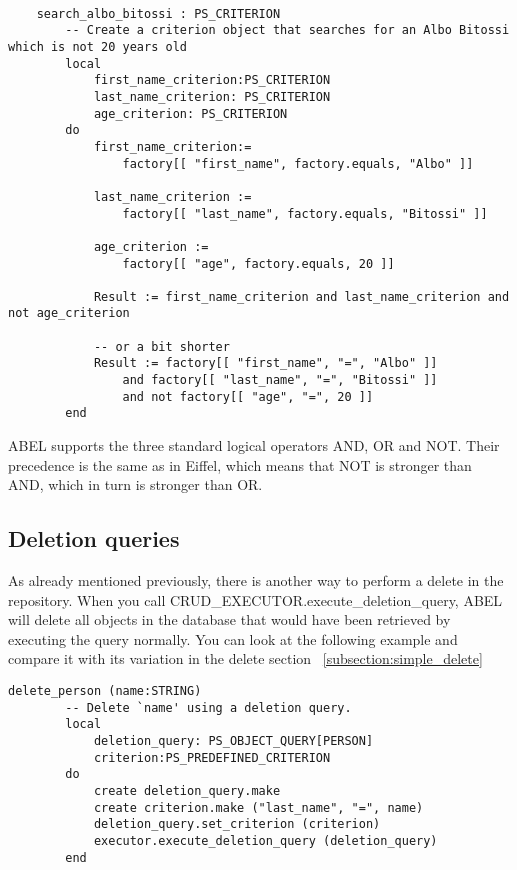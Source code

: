 \begin{lstlisting}[language=OOSC2Eiffel, captionpos=b, caption={}, label={lst:search_albo_bitossi}]

	search_albo_bitossi : PS_CRITERION
		-- Create a criterion object that searches for an Albo Bitossi which is not 20 years old
		local
			first_name_criterion:PS_CRITERION
			last_name_criterion: PS_CRITERION
			age_criterion: PS_CRITERION
		do
			first_name_criterion:= 
				factory[[ "first_name", factory.equals, "Albo" ]]

			last_name_criterion := 
				factory[[ "last_name", factory.equals, "Bitossi" ]]

			age_criterion := 
				factory[[ "age", factory.equals, 20 ]]
			
			Result := first_name_criterion and last_name_criterion and not age_criterion

			-- or a bit shorter
			Result := factory[[ "first_name", "=", "Albo" ]] 
				and factory[[ "last_name", "=", "Bitossi" ]] 
				and not factory[[ "age", "=", 20 ]]
		end
\end{lstlisting}

ABEL supports the three standard logical operators AND, OR and NOT. 
Their precedence is the same as in Eiffel, which means that NOT is stronger than AND, which in turn is stronger than OR.


\subsection{Deletion queries}
\label{subsection:deletion_query}


As already mentioned previously, there is another way to perform a delete in the repository.
When you call CRUD\_EXECUTOR.execute\_deletion\_query, ABEL will delete all objects in the database that would have been retrieved by executing the query normally.
You can look at the following example and compare it with its variation in the delete section ~\ref{subsection:simple_delete}

\begin{lstlisting}[language=OOSC2Eiffel, captionpos=b, caption={}, label={lst:deletion_query}]
	delete_person (name:STRING)
		-- Delete `name' using a deletion query.
		local
			deletion_query: PS_OBJECT_QUERY[PERSON]
			criterion:PS_PREDEFINED_CRITERION
		do
			create deletion_query.make
			create criterion.make ("last_name", "=", name)
			deletion_query.set_criterion (criterion)
			executor.execute_deletion_query (deletion_query)
		end
\end{lstlisting}

